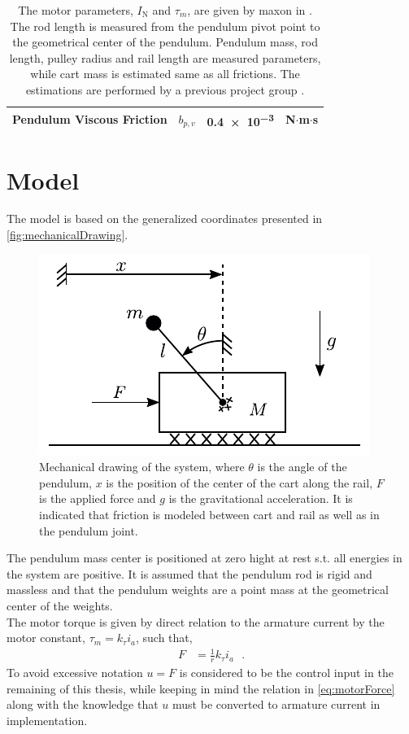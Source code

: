 \begin{table}[H]
\begin{tabular}{|l|l|l|l|}
    \hline %
    Pendulum Viscous Friction &   $b_{p,v}$       &   \num{0.4e-3}    &  N$\cdot$m$\cdot$s      \\
    \hline %
  \end{tabular}
  \caption{The motor parameters, $I_{\mathrm{N}}$ and $\tau_m$, are given by maxon in \cite{maxonMotor}. The rod length is measured from the pendulum pivot point to the geometrical center of the pendulum. Pendulum mass, rod length, pulley radius and rail length are measured parameters, while cart mass is estimated same as all frictions. The estimations are performed by a previous project group \cite{JHHorgensen}.\label{table:systemParameters}}
\end{table}

\section{Model}\label{sec:model}
The model is based on the generalized coordinates presented in \autoref{fig:mechanicalDrawing}.
\begin{figure}[H]
  \includegraphics[width=.35\textwidth]{figures/mechanicalDrawing}
  \caption{Mechanical drawing of the system, where $\theta$ is the angle of the pendulum, $x$ is the position of the center of the cart along the rail, $F$ is the applied force and $g$ is the gravitational acceleration. It is indicated that friction is modeled between cart and rail as well as in the pendulum joint.}
  \label{fig:mechanicalDrawing}
\end{figure}
The pendulum mass center is positioned at zero hight at rest s.t. all energies in the system are positive. It is assumed that the pendulum rod is rigid and massless and that the pendulum weights are a point mass at the geometrical center of the weights.\\
The motor torque is given by direct relation to the armature current by the motor constant, $\tau_m = k_\tau i_a $, such that,
\begin{align}
  F &= \tfrac{1}{r} k_\tau i_a  \ \ \ .
\label{eq:motorForce}
\end{align}
%
To avoid excessive notation $u=F$ is considered to be the control input in the remaining of this thesis, while keeping in mind the relation in \autoref{eq:motorForce} along with the knowledge that $u$ must be converted to armature current in implementation.

